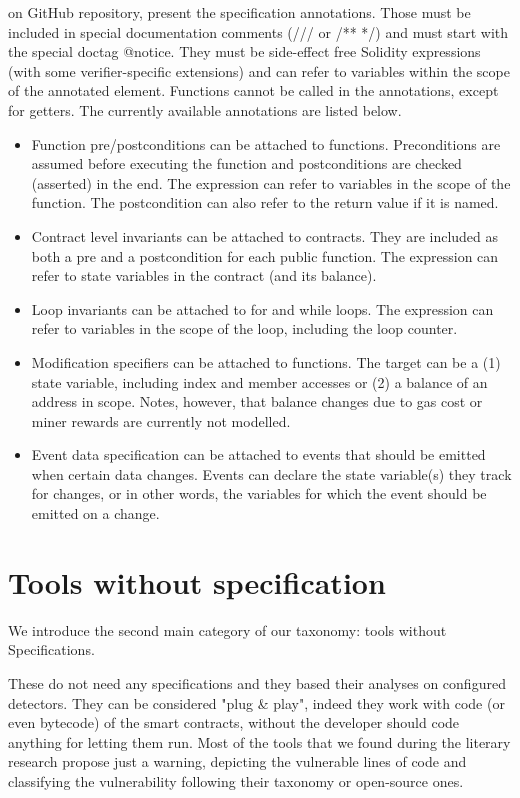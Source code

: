 \citet{SolcVerify_3} on GitHub repository, present the specification annotations. Those must be included in special documentation comments (/// or /** */) and must start with the special doctag @notice. 
They must be side-effect free Solidity expressions (with some verifier-specific extensions) and can refer to variables within the scope of the annotated element. Functions cannot be called in the annotations, except for getters.
The currently available annotations are listed below. 

\begin{itemize}
    \item Function pre/postconditions can be attached to functions. Preconditions are assumed before executing the function and postconditions are checked (asserted) in the end. The expression can refer to variables in the scope of the function. The postcondition can also refer to the return value if it is named.
    \item Contract level invariants can be attached to contracts. They are included as both a pre and a postcondition for each public function. The expression can refer to state variables in the contract (and its balance).
    \item Loop invariants can be attached to for and while loops. The expression can refer to variables in the scope of the loop, including the loop counter.
    \item Modification specifiers can be attached to functions. The target can be a (1) state variable, including index and member accesses or (2) a balance of an address in scope. Notes, however, that balance changes due to gas cost or miner rewards are currently not modelled.
    \item Event data specification can be attached to events that should be emitted when certain data changes. 
    Events can declare the state variable(s) they track for changes, or in other words, the variables for which the event should be emitted on a change.
\end{itemize}

\section{Tools without specification}
\label{sec:Tools:WithoutSpecification}
We introduce the second main category of our taxonomy: tools without Specifications.

These do not need any specifications and they based their analyses on configured detectors. They can be considered "plug \& play", 
indeed they work with code (or even bytecode) of the smart contracts, without the developer should code anything for letting them run. 
Most of the tools that we found during the literary research propose just a warning, depicting the vulnerable lines of code and classifying 
the vulnerability following their taxonomy or open-source ones.


